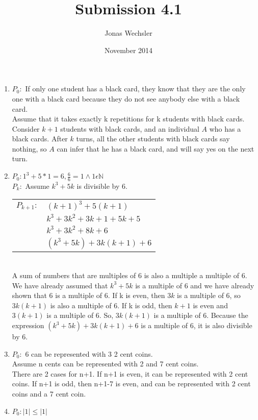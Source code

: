 \documentclass{article}
\title{Submission 4.1}
\author{Jonas Wechsler}
\date{November 2014}
\begin{document}
	\maketitle
	\begin{enumerate}
		\item
			$P_0:$ If only one student has a black card, they know that they are the only one with a black card because they do not see anybody else with a black card.\\
			Assume that it takes exactly k repetitions for k students with black cards.\\
			Consider $k+1$ students with black cards, and an individual $A$ who has a black cards. After $k$ turns, all the other students with black cards say nothing, so $A$ can infer that he has a black card, and will say yes on the next turn.
		\item
			$P_0: 1^3 + 5*1 = 6, \frac{6}{6} = 1 \land 1 \epsilon \mathbb{N}$\\
			$P_k:$ Assume $k^3 + 5k$ is divisible by 6.\\
			\begin{tabular}{l l}
				$P_{k+1}:$ & $ (k+1)^3 + 5(k+1)$\\
				& $ k^3 + 3k^2 + 3k + 1 + 5k + 5$\\
				& $ k^3 + 3k^2 + 8k + 6$\\
				& $ (k^3 + 5k) + 3k(k + 1) + 6$\\
			\end{tabular}\\
			A sum of numbers that are multiples of 6 is also a multiple a multiple of 6. We have already assumed that $k^3 + 5k$ is a multiple of 6 and we have already shown that 6 is a multiple of 6. If k is even, then $3k$ is a multiple of 6, so $3k(k + 1)$ is also a multiple of 6. If k is odd, then $k+1$ is even and $3(k+1)$ is a multiple of 6. So, $3k(k+1)$ is a multiple of 6. Because the expression $(k^3 + 5k) + 3k(k+1) + 6$ is a multiple of 6, it is also divisible by 6.
		\item
			$P_0:$ 6 can be represented with 3 2 cent coins.\\
			Assume n cents can be represented with 2 and 7 cent coins.\\
			There are 2 cases for n+1. If n+1 is even, it can be represented with 2 cent coins. If n+1 is odd, then n+1-7 is even, and can be represented with 2 cent coins and a 7 cent coin.\\
		\item
			$P_0: |1| \leq |1|$\\

\end{enumerate}
\end{document}
